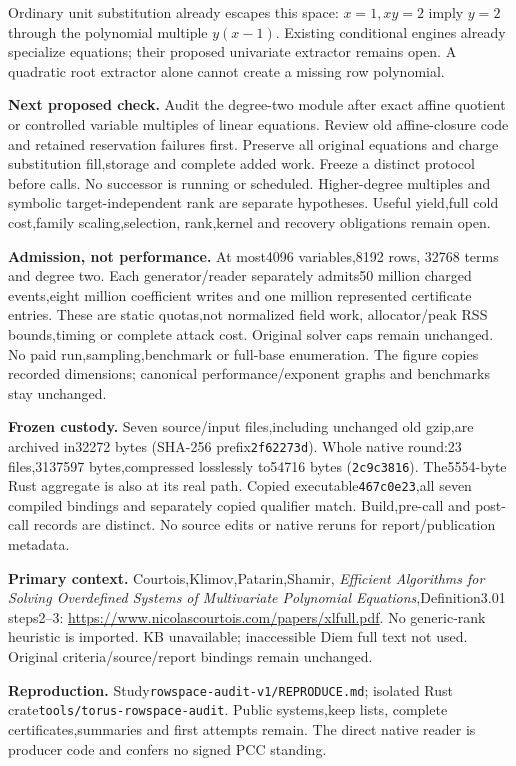 \documentclass[10pt]{article}
\begin{document}
Ordinary unit substitution already escapes this space: $x=1,xy=2$ imply
$y=2$ through the polynomial multiple $y(x-1)$. Existing conditional engines
already specialize equations; their proposed univariate extractor remains
open. A quadratic root extractor alone cannot create a missing row polynomial.

\textbf{Next proposed check.} Audit the degree-two module after exact affine
quotient or controlled variable multiples of linear equations. Review old
affine-closure code and retained reservation failures first. Preserve all
original equations and charge substitution fill,storage and complete added
work. Freeze a distinct protocol before calls. No successor is running or
scheduled. Higher-degree multiples and symbolic target-independent rank are
separate hypotheses. Useful yield,full cold cost,family scaling,selection,
rank,kernel and recovery obligations remain open.

\textbf{Admission, not performance.} At most4096 variables,8192 rows,
32768 terms and degree two. Each generator/reader separately admits50 million
charged events,eight million coefficient writes and one million represented
certificate entries. These are static quotas,not normalized field work,
allocator/peak RSS bounds,timing or complete attack cost. Original solver caps
remain unchanged. No paid run,sampling,benchmark or full-base enumeration.
The figure copies recorded dimensions; canonical performance/exponent graphs
and benchmarks stay unchanged.

\textbf{Frozen custody.} Seven source/input files,including unchanged old
gzip,are archived in32272 bytes (SHA-256 prefix\texttt{2f62273d}). Whole native
round:23 files,3137597 bytes,compressed losslessly to54716 bytes
(\texttt{2c9c3816}). The5554-byte Rust aggregate is also at its real path.
Copied executable\texttt{467c0e23},all seven compiled bindings and separately
copied qualifier match. Build,pre-call and post-call records are distinct.
No source edits or native reruns for report/publication metadata.

\textbf{Primary context.} Courtois,Klimov,Patarin,Shamir,
\emph{Efficient Algorithms for Solving Overdefined Systems of Multivariate
Polynomial Equations},Definition3.01 steps2--3:
\url{https://www.nicolascourtois.com/papers/xlfull.pdf}.
No generic-rank heuristic is imported. KB unavailable; inaccessible Diem full
text not used. Original criteria/source/report bindings remain unchanged.

\textbf{Reproduction.} Study\texttt{rowspace-audit-v1/REPRODUCE.md}; isolated
Rust crate\texttt{tools/torus-rowspace-audit}. Public systems,keep lists,
complete certificates,summaries and first attempts remain. The direct native
reader is producer code and confers no signed PCC standing.
\end{document}

